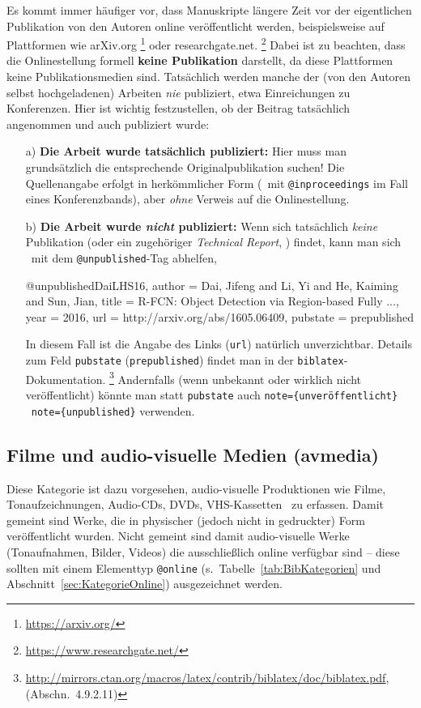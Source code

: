 Es kommt immer häufiger vor, dass Manuskripte längere Zeit vor der eigentlichen Pub\-likation
von den Autoren online veröffentlicht werden,
beispielsweise auf Plattformen wie \textsf{arXiv.org}%
\footnote{\url{https://arxiv.org/}}
oder \textsf{researchgate.net}.%
\footnote{\url{https://www.researchgate.net/}}
Dabei ist zu beachten, dass die Onlinestellung formell \textbf{keine Publikation}
darstellt, da diese Plattformen keine Publikationsmedien sind.
Tatsächlich werden manche der (von den Autoren selbst hochgeladenen) Arbeiten \emph{nie}
publiziert, etwa Einreichungen zu Konferenzen.
Hier ist wichtig festzustellen, ob der Beitrag tatsächlich
angenommen und auch publiziert wurde:
%
\begin{itemize}
\item[a)]
\textbf{Die Arbeit wurde tatsächlich publiziert:} Hier muss man grundsätzlich die 
entsprechende Original\-publikation suchen! 
Die Quellenangabe erfolgt in herkömmlicher Form (\zB\ mit \texttt{@inproceedings} 
im Fall eines Konferenzbands), aber \emph{ohne} Verweis auf die Onlinestellung.
\item[b)]
\textbf{Die Arbeit wurde \emph{nicht} publiziert:} Wenn sich tatsächlich \emph{keine} 
Publikation (oder ein zugehöriger \emph{Technical Report}, \so) findet,  kann man sich 
\evtl\ mit dem \texttt{@unpublished}-Tag abhelfen, \zB\ \cite{DaiLHS16}
\begin{GenericCode}[numbers=none]
@unpublished{DaiLHS16,
  author = {Dai, Jifeng and Li, Yi and He, Kaiming and Sun, Jian},
  title = {{R-FCN:} Object Detection via Region-based Fully ...},
  year = {2016},
  url = {http://arxiv.org/abs/1605.06409},
  pubstate = {prepublished}
}
\end{GenericCode}
In diesem Fall ist die Angabe des Links (\texttt{url}) natürlich unverzichtbar. 
Details zum Feld \texttt{pubstate} (\texttt{prepublished}) findet man in der
\texttt{biblatex}-Dokumentation.%
\footnote{\url{http://mirrors.ctan.org/macros/latex/contrib/biblatex/doc/biblatex.pdf},
(Abschn.\ 4.9.2.11)}
Andernfalls (wenn unbekannt oder wirklich nicht veröffentlicht) könnte man 
statt \texttt{pubstate} auch \texttt{note=\{unveröffentlicht\}} 
\bzw\ \texttt{note=\{unpublished\}} verwenden.
\end{itemize}



\subsection{Filme und audio-visuelle Medien (\textsf{avmedia})}
\label{sec:KategorieAvmedia}
Diese Kategorie ist dazu vorgesehen, audio-visuelle Produktionen wie Filme, 
Tonaufzeichnungen, Audio-CDs, DVDs, VHS-Kassetten \usw\ zu erfassen.
Damit gemeint sind Werke, die in physischer (jedoch nicht in gedruckter) Form
veröffentlicht wurden.
Nicht gemeint sind damit audio-visuelle Werke (Tonaufnahmen, Bilder, Videos) 
die ausschließlich online verfügbar sind -- diese sollten mit einem Elementtyp 
\texttt{@online} (s.\ Tabelle~\ref{tab:BibKategorien} und Abschnitt~\ref{sec:KategorieOnline}) ausgezeichnet werden.

